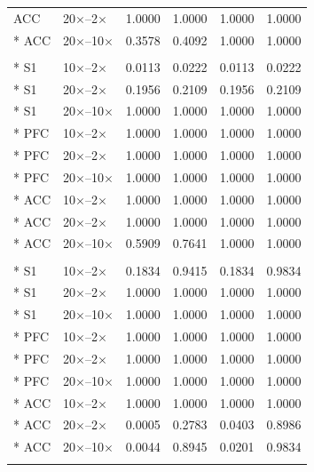 \begin{longtable}{llrrrr}
ACC & 20$\times$--2$\times$ & 1.0000 & 1.0000 & 1.0000 & 1.0000 \\*
ACC & 20$\times$--10$\times$ & 0.3578 & 0.4092 & 1.0000 & 1.0000 \\
\addlinespace
\multicolumn{6}{l}{\textbf{Aperiodic offset}} \\*
S1 & 10$\times$--2$\times$ & 0.0113 & 0.0222 & 0.0113 & 0.0222 \\*
S1 & 20$\times$--2$\times$ & 0.1956 & 0.2109 & 0.1956 & 0.2109 \\*
S1 & 20$\times$--10$\times$ & 1.0000 & 1.0000 & 1.0000 & 1.0000 \\*
PFC & 10$\times$--2$\times$ & 1.0000 & 1.0000 & 1.0000 & 1.0000 \\*
PFC & 20$\times$--2$\times$ & 1.0000 & 1.0000 & 1.0000 & 1.0000 \\*
PFC & 20$\times$--10$\times$ & 1.0000 & 1.0000 & 1.0000 & 1.0000 \\*
ACC & 10$\times$--2$\times$ & 1.0000 & 1.0000 & 1.0000 & 1.0000 \\*
ACC & 20$\times$--2$\times$ & 1.0000 & 1.0000 & 1.0000 & 1.0000 \\*
ACC & 20$\times$--10$\times$ & 0.5909 & 0.7641 & 1.0000 & 1.0000 \\
\addlinespace
\multicolumn{6}{l}{\textbf{Aperiodic-adjusted power}} \\*
S1 & 10$\times$--2$\times$ & 0.1834 & 0.9415 & 0.1834 & 0.9834 \\*
S1 & 20$\times$--2$\times$ & 1.0000 & 1.0000 & 1.0000 & 1.0000 \\*
S1 & 20$\times$--10$\times$ & 1.0000 & 1.0000 & 1.0000 & 1.0000 \\*
PFC & 10$\times$--2$\times$ & 1.0000 & 1.0000 & 1.0000 & 1.0000 \\*
PFC & 20$\times$--2$\times$ & 1.0000 & 1.0000 & 1.0000 & 1.0000 \\*
PFC & 20$\times$--10$\times$ & 1.0000 & 1.0000 & 1.0000 & 1.0000 \\*
ACC & 10$\times$--2$\times$ & 1.0000 & 1.0000 & 1.0000 & 1.0000 \\*
ACC & 20$\times$--2$\times$ & 0.0005 & 0.2783 & 0.0403 & 0.8986 \\*
ACC & 20$\times$--10$\times$ & 0.0044 & 0.8945 & 0.0201 & 0.9834 \\
\addlinespace
\bottomrule
\end{longtable}
